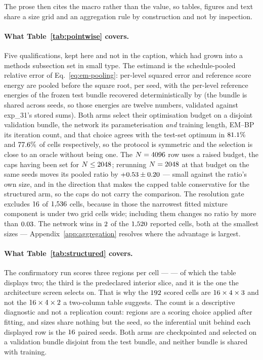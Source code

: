 \noindent The prose then cites the macro rather than the value, so tables,
figures and text share a size grid and an aggregation rule by construction
and not by inspection.

\paragraph{What Table~\ref{tab:pointwise} covers.} Five qualifications, kept
here and not in the caption, which had grown into a methods subsection
set in small type. The estimand is the schedule-pooled relative error of
Eq.~\eqref{eq:em-pooling}: per-level squared error and reference score energy
are pooled before the square root, per seed, with the per-level reference
energies of the frozen test bundle recovered deterministically by
 (the bundle is shared across seeds,
so those energies are twelve numbers, validated against exp\_31's stored
sums). Both arms select their optimisation budget on a disjoint
validation bundle, the network its parameterisation \emph{and} training
length, EM--BP its iteration count, and that choice agrees with the
test-set optimum in $81.1\%$ and $77.6\%$ of cells respectively, so
the protocol is symmetric and the selection is close to an oracle without
being one. The $N=4096$ row uses a raised budget, the caps having
been set for $N\le2048$; rerunning $N=2048$ at that budget
on the same seeds moves its pooled ratio by $+0.53\pm0.20$
--- small against the ratio's own size, and in the direction that makes the
capped table conservative for the structured arm, so the caps do not carry
the comparison. The resolution gate excludes $16$ of
$1{,}536$ cells, because in those the narrowest fitted mixture component is
under two grid cells wide; including them changes no ratio by more than
$0.03$. The network wins in $2$ of the $1{,}520$ reported
cells, both at the smallest sizes --- Appendix~\ref{app:aggregation} resolves
where the advantage is largest.

\paragraph{What Table~\ref{tab:structured} covers.} The confirmatory run scores
three regions per cell --- \structregionlist{} --- of which the table displays
two; the third is the predeclared interior slice, and it is the one the
architecture screen selects on. That is why the $192$ scored cells are
$16 \times 4 \times 3$ and not the
$16 \times 4 \times 2$ a two-column table suggests. The
count is a descriptive diagnostic and not a replication count: regions are a
scoring choice applied after fitting, and sizes share nothing but the seed, so
the inferential unit behind each displayed row is the $16$ paired
seeds. Both arms are checkpointed and selected on a validation bundle disjoint
from the test bundle, and neither bundle is shared with training.

